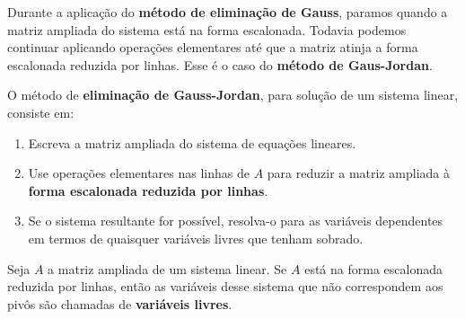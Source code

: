 \documentclass{beamer}
\begin{document}
    \begin{frame}
        Durante a aplicação do \textbf{método de eliminação de Gauss}, \pause paramos quando a matriz ampliada do sistema está na forma escalonada. \pause
        Todavia podemos continuar aplicando operações elementares \pause até que a matriz atinja a forma escalonada reduzida por linhas. \pause Esse é o caso do
        \textbf{método de Gaus-Jordan}.\pause

        \begin{definicao}
            O método de \textbf{eliminação de Gauss-Jordan}, \pause para solução de um sistema linear, consiste em:\pause
            \begin{enumerate}[label={\roman*})]
                \item Escreva a matriz ampliada do sistema de equações lineares.\pause

                \item Use operações elementares nas linhas de $A$ \pause para reduzir a matriz ampliada à \textbf{forma escalonada reduzida por linhas}.\pause

                \item Se o sistema resultante for possível, resolva-o para as variáveis dependentes em termos de quaisquer variáveis livres que tenham sobrado.
            \end{enumerate}
        \end{definicao}
    \end{frame}

    \begin{frame}
        \begin{definicao}
            Seja $A$ a matriz ampliada de um sistema linear. \pause Se $A$ está na forma escalonada reduzida por linhas, \pause então as variáveis desse sistema \pause que não correspondem aos pivôs \pause são chamadas de \textbf{variáveis livres}.
        \end{definicao}
    \end{frame}
\end{document}
